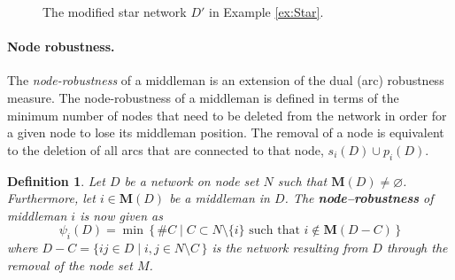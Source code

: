 \documentclass[11pt,fleqn]{article}
\newtheorem{definition}[theorem]{Definition}
\begin{document}
\begin{figure}[h]
\begin{center}
\end{center}
\caption{The modified star network $D'$ in Example \ref{ex:Star}.}
\label{fig:StarMod}
\end{figure}


\paragraph{Node robustness.}

The \emph{node-robustness} of a middleman is an extension of the dual (arc) robustness measure. The node-robustness of a middleman is defined in terms of the minimum number of nodes that need to be deleted from the network in order for a given node to lose its middleman position. The removal of a node is equivalent to the deletion of all arcs that are connected to that node, $s_i (D) \cup p_i(D)$.

\begin{definition}
Let $D$ be a network on node set $N$ such that $\mathbf{M}(D) \neq \varnothing$. Furthermore, let $i \in  \mathbf{M}(D)$ be a middleman in $D$. The \textbf{node--robustness} of middleman $i$ is now given as
\begin{equation}
\psi_{i} (D) = \min \, \{ \, \# C \mid C \subset N \setminus \{ i \} \mbox{ such that } i \notin \mathbf{M}(D-C) \, \}
\end{equation}
where $D-C = \{ ij \in D \mid i,j \in N \setminus C \, \}$ is the network resulting from $D$ through the removal of the node set $M$.
\end{definition}
\end{document}
